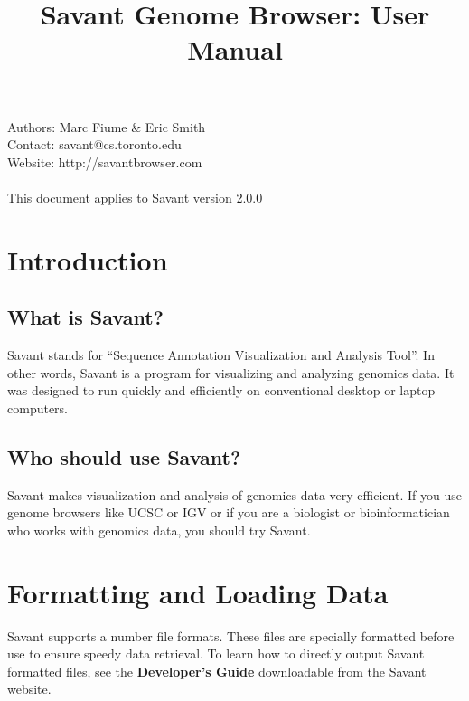 \documentclass{report}
\begin{document}
\title{Savant Genome Browser: User Manual}
\maketitle

\setlength{\parindent}{0pt} 
\setlength{\parskip}{2ex}

Authors: Marc Fiume & Eric Smith\\
Contact: savant@cs.toronto.edu \\
Website: http://savantbrowser.com \\
\\
This document applies to Savant version 2.0.0\\

\newpage

\tableofcontents

\newpage

\chapter{Introduction}

\section{What is Savant?}

Savant stands for ``Sequence Annotation Visualization and Analysis Tool''. In other words, Savant is a program for visualizing and analyzing genomics data. It was designed to run quickly and efficiently on conventional desktop or laptop computers.

\section{Who should use Savant?}

Savant makes visualization and analysis of genomics data very efficient. If you use genome browsers like UCSC or IGV or if you are a biologist or bioinformatician who works with genomics data, you should try Savant. 

\chapter{Formatting and Loading Data}

Savant supports a number file formats. These files are specially formatted before use to ensure speedy data retrieval. To learn how to directly output Savant formatted files, see the {\bf Developer's Guide} downloadable from the Savant website.
\end{document}
